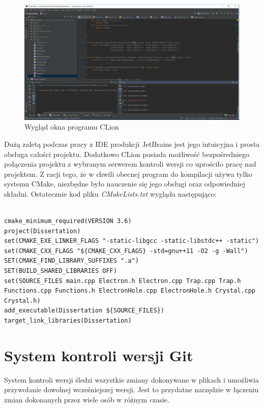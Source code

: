 \begin{figure}[h]
\centering
\includegraphics[width=17cm]{clion}
\caption{Wygląd okna programu CLion \cite{struktura_pasmowa}}
\label{fig:clion}
\end{figure}

Dużą zaletą podczas pracy z IDE produkcji JetBrains jest jego intuicyjna i prosta obsługa całości projektu. Dodatkowo CLion posiada możliwość bezpośredniego połączenia projektu z wybranym serwerem kontroli wersji co uprościło pracę nad projektem. Z racji tego, że w chwili obecnej program do kompilacji używa tylko systemu CMake, niezbędne było nauczenie się jego obsługi oraz odpowiedniej składni.
Ostatecznie kod pliku \emph{CMakeLists.txt} wygląda następująco:
\begin{verbatim}

cmake_minimum_required(VERSION 3.6)
project(Dissertation)
set(CMAKE_EXE_LINKER_FLAGS "-static-libgcc -static-libstdc++ -static")
set(CMAKE_CXX_FLAGS "${CMAKE_CXX_FLAGS} -std=gnu++11 -O2 -g -Wall")
SET(CMAKE_FIND_LIBRARY_SUFFIXES ".a")
SET(BUILD_SHARED_LIBRARIES OFF)
set(SOURCE_FILES main.cpp Electron.h Electron.cpp Trap.cpp Trap.h Functions.cpp Functions.h ElectronHole.cpp ElectronHole.h Crystal.cpp Crystal.h)
add_executable(Dissertation ${SOURCE_FILES})
target_link_libraries(Dissertation)

\end{verbatim}
\section{System kontroli wersji Git}

System kontroli wersji śledzi wszystkie zmiany dokonywane w plikach i umożliwia przywołanie dowolnej wcześniejszej wersji. Jest to przydatne narzędzie w łączeniu zmian dokonanych przez wiele osób w różnym czasie.

